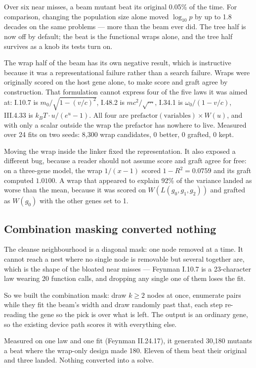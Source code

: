 \documentclass[11pt,a4paper]{article}
\begin{document}
Over six near misses, a beam mutant beat its original 0.05\% of the time.
For comparison, changing the population size alone moved $\log_{10} p$ by up to
1.8 decades on the same problems --- more than the beam ever did. The tree half
is now off by default; the beat is the functional wraps alone, and the tree half
survives as a knob its tests turn on.

The wrap half of the beam has its own negative result, which is instructive
because it was a representational failure rather than a search failure. Wraps
were originally scored on the host gene alone, to make score and graft agree by
construction. That formulation cannot express four of the five laws it was aimed
at: I.10.7 is $m_0/\sqrt{1 - (v/c)^2}$, I.48.2 is $mc^2/\sqrt{\cdots}$, I.34.1 is
$\omega_0/(1 - v/c)$, III.4.33 is $k_B T \cdot u/(e^u - 1)$. All four are
$\text{prefactor}(\text{variables}) \times W(u)$, and with only a scalar outside
the wrap the prefactor has nowhere to live. Measured over 24 fits on two seeds:
8{,}300 wrap candidates, 0 better, 0 grafted, 0 kept.

Moving the wrap inside the linker fixed the representation. It also exposed a
different bug, because a reader should not assume score and graft
agree for free: on a three-gene model, the wrap $1/(x-1)$ scored $1-R^2 =
0.0759$ and its graft computed $1.0100$. A wrap that appeared to explain 92\% of
the variance landed as worse than the mean, because it was scored on
$W(L(g_0,g_1,g_2))$ and grafted as $W(g_0)$ with the other genes set to 1.

\subsection{Combination masking converted nothing}

The cleanse neighbourhood is a diagonal mask: one node removed at a time. It
cannot reach a nest where no single node is removable but several together are,
which is the shape of the bloated near misses --- Feynman I.10.7 is a
23-character law wearing 20 function calls, and dropping any single one of them
loses the fit.

So we built the combination mask: draw $k \ge 2$ nodes at once, enumerate pairs
while they fit the beam's width and draw randomly past that, each step re-reading
the gene so the pick is over what is left. The output is an ordinary gene, so the
existing device path scores it with everything else.

Measured on one law and one fit (Feynman II.24.17), it generated 30{,}180
mutants a beat where the wrap-only design made 180. Eleven of them beat their
original and three landed. Nothing converted into a solve.
\end{document}
